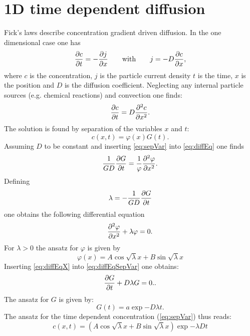 \section{1D time dependent diffusion}

Fick's laws describe concentration gradient driven diffusion. In the one dimensional case one has
  \begin{equation}
    \frac{\partial c}{\partial t} = - \frac{\partial j}{\partial x} \qquad {\rm with} \qquad j = -D \frac{\partial c}{\partial x}, 
  \end{equation}
  where $c$ is the concentration, $j$ is the particle current density $t$ is the time, $x$ is the position and $D$ is the diffusion coefficient.
  Neglecting any internal particle sources (e.g. chemical reactions) and convection one finds: 
  \begin{equation}
    \frac{\partial c}{\partial t} = D \frac{\partial^2 c}{\partial {x}^2}.
    \label{eq:diffEq}
  \end{equation}
  The solution is found by separation of the variables $x$ and $t$:
  \begin{equation}
    c(x,t) = \varphi(x) G(t).
    \label{eq:sepVar}
  \end{equation}
  Assuming $D$ to be constant and inserting \cref{eq:sepVar} into \cref{eq:diffEq} one finds
  \begin{equation}
    \frac{1}{GD} \frac{\partial G}{\partial t} = \frac{1}{\varphi} \frac{\partial^2 \varphi}{\partial {x}^2}.
    \label{eq:diffEqSepVar}
  \end{equation}
  Defining
  \begin{equation}
    \lambda = -\frac{1}{GD} \frac{\partial G}{\partial t}
  \end{equation}
  one obtains the following differential equation
  \begin{equation}
    \frac{\partial^2 \varphi}{\partial {x}^2} + \lambda \varphi = 0.
    \label{eq:diffEqX}
  \end{equation}
  For $\lambda>0$ the ansatz for $\varphi$ is given by 
  \begin{equation}
    \varphi(x) = A \cos{\sqrt{\lambda}x} + B \sin{\sqrt{\lambda}x}
    \label{eq:ansatzPhi}
  \end{equation}
  Inserting \cref{eq:diffEqX} into \cref{eq:diffEqSepVar} one obtains:
  \begin{equation}
    \frac{\partial G}{\partial t} + D \lambda G = 0.
    \label{eq:diffEqT}.
  \end{equation}
  The ansatz for $G$ is given by:
  \begin{equation}
    G(t) = a \exp{-D\lambda t}.
  \end{equation}
  The ansatz for the time dependent concentration (\cref{eq:sepVar}) thus reads:
  \begin{equation}
    c(x,t) = \left( A \cos{\sqrt{\lambda}x} + B \sin{\sqrt{\lambda}x} \right) \exp{ -\lambda Dt}
    \label{eq:ansatzC}
  \end{equation}

